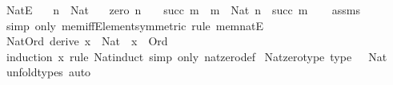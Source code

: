 \begin{isabellebody}
\endisatagproof
{\isafoldproof}%
%
\isadelimproof
\isanewline
%
\endisadelimproof
\isanewline
\isanewline
{}\isamarkupfalse%
\ NatE{\isacharcolon}{\kern0pt}\isanewline
\ \ \ {\isachardoublequoteopen}n\ {\isacharcolon}{\kern0pt}\ Nat{\isachardoublequoteclose}\isanewline
\ \ \ {\isacharparenleft}{\kern0pt}zero{\isacharparenright}{\kern0pt}\ {\isachardoublequoteopen}n\ {\isacharequal}{\kern0pt}\ {}{\isachardoublequoteclose}\ {\isacharbar}{\kern0pt}\ {\isacharparenleft}{\kern0pt}succ{\isacharparenright}{\kern0pt}\ m\ \ {\isachardoublequoteopen}m\ {\isacharcolon}{\kern0pt}\ Nat{\isachardoublequoteclose}\ {\isachardoublequoteopen}n\ {\isacharequal}{\kern0pt}\ succ\ m{\isachardoublequoteclose}\isanewline
%
\isadelimproof
\ \ %
\endisadelimproof
%
\isatagproof
{}\isamarkupfalse%
\ assms\ \isamarkupfalse%
\ {\isacharparenleft}{\kern0pt}simp\ only{\isacharcolon}{\kern0pt}\ mem{\isacharunderscore}{\kern0pt}iff{\isacharunderscore}{\kern0pt}Element{\isacharbrackleft}{\kern0pt}symmetric{\isacharbrackright}{\kern0pt}{\isacharparenright}{\kern0pt}\ {\isacharparenleft}{\kern0pt}rule\ mem{\isacharunderscore}{\kern0pt}natE{\isacharparenright}{\kern0pt}%
\endisatagproof
{\isafoldproof}%
%
\isadelimproof
\isanewline
%
\endisadelimproof
\isanewline
{}\isamarkupfalse%
\ Nat{\isacharunderscore}{\kern0pt}Ord\ {\isacharbrackleft}{\kern0pt}derive{\isacharbrackright}{\kern0pt}{\isacharcolon}{\kern0pt}\ {\isachardoublequoteopen}x\ {\isacharcolon}{\kern0pt}\ Nat\ {\isasymLongrightarrow}\ x\ {\isacharcolon}{\kern0pt}\ Ord{\isachardoublequoteclose}\isanewline
%
\isadelimproof
\ \ %
\endisadelimproof
%
\isatagproof
{}\isamarkupfalse%
\ {\isacharparenleft}{\kern0pt}induction\ x\ rule{\isacharcolon}{\kern0pt}\ Nat{\isacharunderscore}{\kern0pt}induct{\isacharparenright}{\kern0pt}\ {\isacharparenleft}{\kern0pt}simp\ only{\isacharcolon}{\kern0pt}\ nat{\isacharunderscore}{\kern0pt}zero{\isacharunderscore}{\kern0pt}def{\isacharparenright}{\kern0pt}%
\endisatagproof
{\isafoldproof}%
%
\isadelimproof
\isanewline
%
\endisadelimproof
\isanewline
{}\isamarkupfalse%
\ Nat{\isacharunderscore}{\kern0pt}zero{\isacharunderscore}{\kern0pt}type\ {\isacharbrackleft}{\kern0pt}type{\isacharbrackright}{\kern0pt}{\isacharcolon}{\kern0pt}\ {\isachardoublequoteopen}{}\ {\isacharcolon}{\kern0pt}\ Nat{\isachardoublequoteclose}%
\isadelimproof
\ %
\endisadelimproof
%
\isatagproof
{}\isamarkupfalse%
\ unfold{\isacharunderscore}{\kern0pt}types\ auto%

\end{isabellebody}
